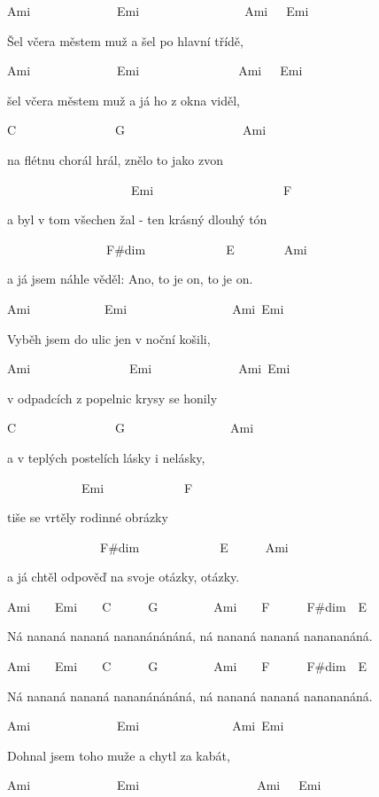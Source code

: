 
Ami~~~~~~~~~~~~~~Emi~~~~~~~~~~~~~~~~~Ami~~~Emi

Šel včera městem muž a šel po hlavní třídě,

Ami~~~~~~~~~~~~~~Emi~~~~~~~~~~~~~~~~Ami~~~Emi

šel včera městem muž a já ho z okna viděl,

C~~~~~~~~~~~~~~~~G~~~~~~~~~~~~~~~~~~~Ami~

na flétnu chorál hrál, znělo to jako zvon

~~~~~~~~~~~~~~~~~~~~Emi~~~~~~~~~~~~~~~~~~~~~F~~

a byl v tom všechen žal - ten krásný dlouhý tón

~~~~~~~~~~~~~~~~F\#dim~~~~~~~~~~~~~E\7~~~~~~~~Ami

a já jsem náhle věděl: Ano, to je on, to je on.

\bigskip

Ami~~~~~~~~~~~~Emi~~~~~~~~~~~~~~~~~Ami~Emi

Vyběh jsem do ulic jen v noční košili,

Ami~~~~~~~~~~~~~~~~Emi~~~~~~~~~~~~~~Ami~Emi

v odpadcích z popelnic krysy se honily

C~~~~~~~~~~~~~~~~G~~~~~~~~~~~~~~~~~Ami

a v teplých postelích lásky i nelásky,

~~~~~~~~~~~~Emi~~~~~~~~~~~~~F~

tiše se vrtěly rodinné obrázky

~~~~~~~~~~~~~~~F\#dim~~~~~~~~~~~~~E\7~~~~~~Ami

a já chtěl odpověď na svoje otázky, otázky.

\bigskip

\begin{chorustext}
Ami~~~~Emi~~~~C~~~~~~G~~~~~~~~~Ami~~~~F~~~~~~F\#dim~~E\7~~~

Ná nananá nananá nananánánáná, ná nananá nananá nanananáná.

Ami~~~~Emi~~~~C~~~~~~G~~~~~~~~~Ami~~~~F~~~~~~F\#dim~~E\7~~~

Ná nananá nananá nananánánáná, ná nananá nananá nanananáná.
\end{chorustext}

\bigskip

Ami~~~~~~~~~~~~~~Emi~~~~~~~~~~~~~~~Ami~Emi

Dohnal jsem toho muže a chytl za kabát,

Ami~~~~~~~~~~~~~~Emi~~~~~~~~~~~~~~~~~~~Ami~~~Emi

